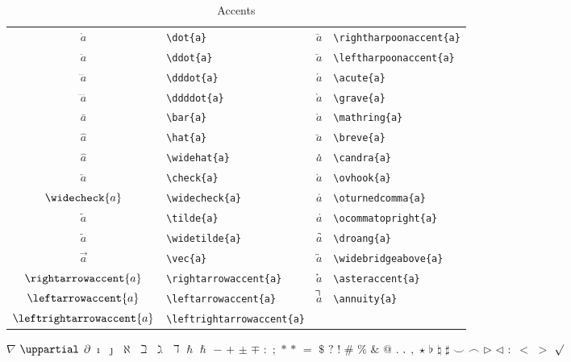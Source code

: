 \documentclass[captions=tableheading]{scrartcl}
\begin{document}
\begin{table}
  \caption{Accents}
  \label{tab:accents}
  \centering
  \begin{tabular}[c]{cl@{\hskip 3em}cl}
    \toprule
    $\dot{a}$ & \verb|\dot{a}| &
    $\rightharpoonaccent{a}$ & \verb|\rightharpoonaccent{a}| \\
    $\ddot{a}$ & \verb|\ddot{a}| &
    $\leftharpoonaccent{a}$ & \verb|\leftharpoonaccent{a}| \\
    $\dddot{a}$ & \verb|\dddot{a}| &
    $\acute{a}$ & \verb|\acute{a}| \\
    $\ddddot{a}$ & \verb|\ddddot{a}| &
    $\grave{a}$ & \verb|\grave{a}| \\
    $\bar{a}$ & \verb|\bar{a}| &
    $\mathring{a}$ & \verb|\mathring{a}| \\
    \addlinespace
    $\hat{a}$ & \verb|\hat{a}| &
    $\breve{a}$ & \verb|\breve{a}| \\
    $\widehat{a}$ & \verb|\widehat{a}| &
    $\candra{a}$ & \verb|\candra{a}| \\
    $\check{a}$ & \verb|\check{a}| &
    $\ovhook{a}$ & \verb|\ovhook{a}| \\
    $\widecheck{a}$ & \verb|\widecheck{a}| &
    $\oturnedcomma{a}$ & \verb|\oturnedcomma{a}| \\
    $\tilde{a}$ & \verb|\tilde{a}| &
    $\ocommatopright{a}$ & \verb|\ocommatopright{a}| \\
    $\widetilde{a}$ & \verb|\widetilde{a}| &
    $\droang{a}$ & \verb|\droang{a}| \\
    \addlinespace
    $\vec{a}$ & \verb|\vec{a}| &
    $\widebridgeabove{a}$ & \verb|\widebridgeabove{a}| \\
    $\rightarrowaccent{a}$ & \verb|\rightarrowaccent{a}| &
    $\asteraccent{a}$ & \verb|\asteraccent{a}| \\
    $\leftarrowaccent{a}$ & \verb|\leftarrowaccent{a}| &
    $\annuity{a}$ & \verb|\annuity{a}| \\
    $\leftrightarrowaccent{a}$ & \verb|\leftrightarrowaccent{a}| &
    & \\
    \bottomrule
  \end{tabular}
\end{table}


$\nabla$
$\uppartial$
$\partial$
$\imath$
$\jmath$
$\aleph$
$\beth$
$\gimel$
$\daleth$
$\hbar$
$\hslash$
$-$
$+$
$\pm$
$\mp$
$:$
$;$
$*$
$\ast$
$=$
$\mathdollar$
$?$
$!$
$\#$
$\%$
$\&$
$@$
$.$
$\ldotp$
$,$
$\star$
$\flat$
$\natural$
$\sharp$
$\smile$
$\frown$
$\triangleright$
$\triangleleft$
$\colon$
$<$
$>$
$\surd$
\end{document}
